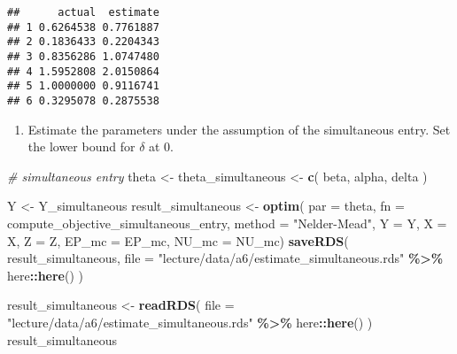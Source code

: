 \documentclass[
]{book}
\newenvironment{Shaded}{\begin{snugshade}}{\end{snugshade}}
\newcommand{\AttributeTok}[1]{\textcolor[rgb]{0.13,0.29,0.53}{#1}}
\newcommand{\CommentTok}[1]{\textcolor[rgb]{0.56,0.35,0.01}{\textit{#1}}}
\newcommand{\FunctionTok}[1]{\textcolor[rgb]{0.13,0.29,0.53}{\textbf{#1}}}
\newcommand{\NormalTok}[1]{#1}
\newcommand{\OtherTok}[1]{\textcolor[rgb]{0.56,0.35,0.01}{#1}}
\newcommand{\SpecialCharTok}[1]{\textcolor[rgb]{0.81,0.36,0.00}{\textbf{#1}}}
\newcommand{\StringTok}[1]{\textcolor[rgb]{0.31,0.60,0.02}{#1}}
\providecommand{\tightlist}{%
  \setlength{\itemsep}{0pt}\setlength{\parskip}{0pt}}
\begin{document}
\begin{verbatim}
##      actual  estimate
## 1 0.6264538 0.7761887
## 2 0.1836433 0.2204343
## 3 0.8356286 1.0747480
## 4 1.5952808 2.0150864
## 5 1.0000000 0.9116741
## 6 0.3295078 0.2875538
\end{verbatim}

\begin{enumerate}
\def\labelenumi{\arabic{enumi}.}
\setcounter{enumi}{6}
\tightlist
\item
  Estimate the parameters under the assumption of the simultaneous entry. Set the lower bound for \(\delta\) at 0.
\end{enumerate}

\begin{Shaded}
\begin{Highlighting}[]
\CommentTok{\# simultaneous entry}
\NormalTok{theta }\OtherTok{\textless{}{-}} 
\NormalTok{  theta\_simultaneous }\OtherTok{\textless{}{-}}
  \FunctionTok{c}\NormalTok{(}
\NormalTok{    beta, }
\NormalTok{    alpha, }
\NormalTok{    delta}
\NormalTok{  )}
\end{Highlighting}
\end{Shaded}

\begin{Shaded}
\begin{Highlighting}[]
\NormalTok{Y }\OtherTok{\textless{}{-}}\NormalTok{ Y\_simultaneous}
\NormalTok{result\_simultaneous }\OtherTok{\textless{}{-}}
  \FunctionTok{optim}\NormalTok{(}
        \AttributeTok{par =}\NormalTok{ theta,}
        \AttributeTok{fn =}\NormalTok{ compute\_objective\_simultaneous\_entry,}
        \AttributeTok{method =} \StringTok{"Nelder{-}Mead"}\NormalTok{,}
        \AttributeTok{Y =}\NormalTok{ Y,}
        \AttributeTok{X =}\NormalTok{ X,}
        \AttributeTok{Z =}\NormalTok{ Z,}
        \AttributeTok{EP\_mc =}\NormalTok{ EP\_mc,}
        \AttributeTok{NU\_mc =}\NormalTok{ NU\_mc)}
\FunctionTok{saveRDS}\NormalTok{(}
\NormalTok{  result\_simultaneous, }
  \AttributeTok{file =} \StringTok{"lecture/data/a6/estimate\_simultaneous.rds"} \SpecialCharTok{\%\textgreater{}\%}\NormalTok{ here}\SpecialCharTok{::}\FunctionTok{here}\NormalTok{()}
\NormalTok{)}
\end{Highlighting}
\end{Shaded}

\begin{Shaded}
\begin{Highlighting}[]
\NormalTok{result\_simultaneous }\OtherTok{\textless{}{-}} 
  \FunctionTok{readRDS}\NormalTok{(}
    \AttributeTok{file =} \StringTok{"lecture/data/a6/estimate\_simultaneous.rds"} \SpecialCharTok{\%\textgreater{}\%}\NormalTok{ here}\SpecialCharTok{::}\FunctionTok{here}\NormalTok{()}
\NormalTok{  )}
\NormalTok{result\_simultaneous}
\end{Highlighting}
\end{Shaded}
\end{document}
